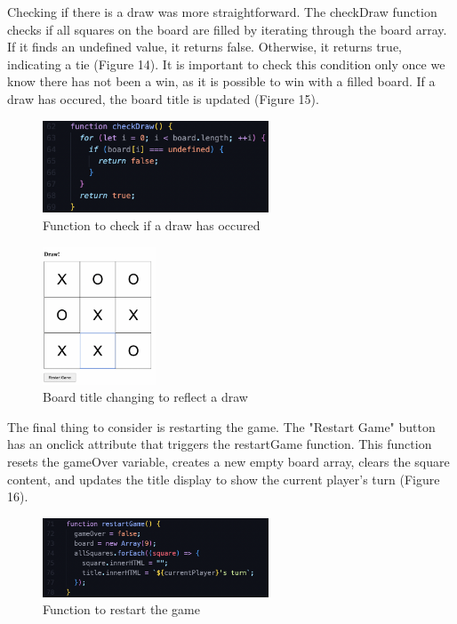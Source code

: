 \documentclass[a4paper, 11pt]{report}
\begin{document}
Checking if there is a draw was more straightforward. The checkDraw function checks if all squares on the board are filled by iterating through the board array. If it finds an undefined value, it returns false. Otherwise, it returns true, indicating a tie (Figure 14). It is important to check this condition only once we know there has not been a win, as it is possible to win with a filled board. If a draw has occured, the board title is updated (Figure 15).

\begin{figure}[ht]
    \centering
    \includegraphics[width=0.6\textwidth]{Images/ttt6.png}
    \caption{Function to check if a draw has occured}
    \label{fig:screenshot}
\end{figure}

\begin{figure}[ht]
    \centering
    \includegraphics[width=0.3\textwidth]{Images/ttt7.png}
    \caption{Board title changing to reflect a draw}
    \label{fig:screenshot}
\end{figure}

The final thing to consider is restarting the game. The "Restart Game" button has an onclick attribute that triggers the restartGame function. This function resets the gameOver variable, creates a new empty board array, clears the square content, and updates the title display to show the current player's turn (Figure 16).

\begin{figure}[ht]
    \centering
    \includegraphics[width=0.6\textwidth]{Images/ttt8.png}
    \caption{Function to restart the game}
    \label{fig:screenshot}
\end{figure}
\end{document}
